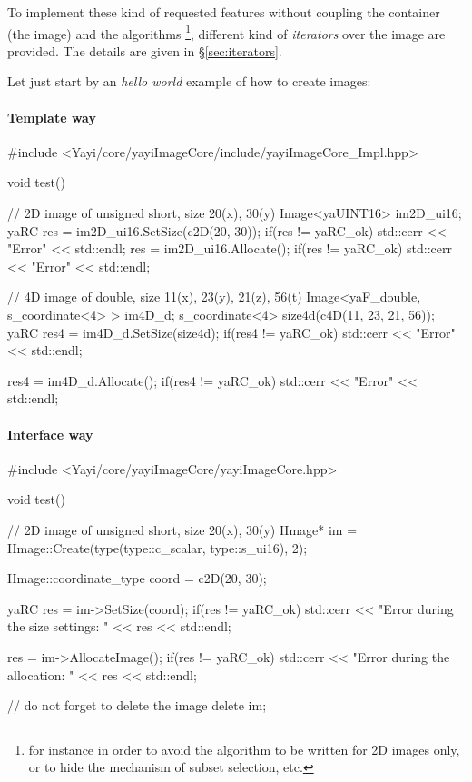 To implement these kind of requested features without coupling the container (the image) and the algorithms \footnote{for instance in order to avoid the algorithm to be written for 2D images only, or to hide the mechanism of subset selection, etc.}, different kind of \textit{iterators} over the image are provided. The details are given in \S \ref{sec:iterators}.

Let just start by an \textit{hello world} example of how to create images:

\paragraph{Template way}
\begin{cpp}
#include <Yayi/core/yayiImageCore/include/yayiImageCore_Impl.hpp>

void test(){
  // 2D image of unsigned short, size 20(x), 30(y)
  Image<yaUINT16> im2D_ui16;
  yaRC res = im2D_ui16.SetSize(c2D(20, 30));
  if(res != yaRC_ok)
    std::cerr << "Error" << std::endl;
  res = im2D_ui16.Allocate();
  if(res != yaRC_ok)
    std::cerr << "Error" << std::endl;

  // 4D image of double, size 11(x), 23(y), 21(z), 56(t)
  Image<yaF_double, s_coordinate<4> > im4D_d;
  s_coordinate<4> size4d(c4D(11, 23, 21, 56));
  yaRC res4 = im4D_d.SetSize(size4d);
  if(res4 != yaRC_ok)
    std::cerr << "Error" << std::endl;
  
  res4 = im4D_d.Allocate();
  if(res4 != yaRC_ok)
    std::cerr << "Error" << std::endl;
  
}
\end{cpp}

\paragraph{Interface way}
\begin{cpp}
#include <Yayi/core/yayiImageCore/yayiImageCore.hpp>

void test(){
  // 2D image of unsigned short, size 20(x), 30(y)
  IImage* im = IImage::Create(type(type::c_scalar, type::s_ui16), 2);
  
  IImage::coordinate_type coord = c2D(20, 30);

  yaRC res = im->SetSize(coord);
  if(res != yaRC_ok)
    std::cerr << "Error during the size settings: " << res << std::endl;
  
  res = im->AllocateImage();
  if(res != yaRC_ok)
    std::cerr << "Error during the allocation: " << res << std::endl;

  // do not forget to delete the image
  delete im;
}  
\end{cpp}



